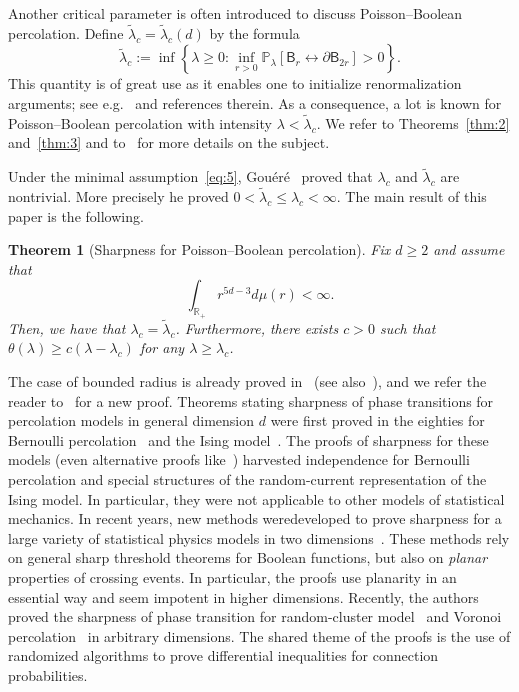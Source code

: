 \documentclass[10pt]{amsart}
\newtheorem{theo}{Theorem}[section]
\theoremstyle{definition}\newtheorem{defi}[theo]{Definition}\newtheorem{rema}[theo]{Remark}\newtheorem{exam}[theo]{Example}\newtheorem{exem}[theo]{Example}\newtheorem{nota}[theo]{Notation}
\begin{document}
Another critical parameter is often introduced to discuss Poisson--Boolean percolation. Define $\widetilde\lambda_c=\widetilde\lambda_c(d)$ by the formula
\[
\widetilde\lambda_c:=\inf\left\{\lambda\ge0:\inf_{r>0}{\mathbb P}_\lambda[\mathsf B_r\stackrel{}{\longleftrightarrow}\partial\mathsf B_{2r}]>0\right\}.
\]
This quantity is of great use as it enables one to initialize renormalization arguments; see e.g.~\cite{Gou1,Gou2} and references therein. As a consequence, a lot is known for Poisson--Boolean percolation with intensity $\lambda<\widetilde\lambda_c$. We refer to Theorems~\ref{thm:2} and~\ref{thm:3} and to~\cite{MeeRoy08} for more details on the subject.

Under the minimal assumption~\eqref{eq:5}, Gouéré~\cite{Gou1} proved that $\lambda_c$ and $\widetilde{\lambda}_c$ are nontrivial. More precisely he proved $0<\widetilde\lambda_c\le\lambda_c <\infty$. The main result of this paper is the following.

\begin{theo}[Sharpness for Poisson--Boolean percolation]\label{thm:main}
Fix $d\ge2$ and assume that
\begin{equation}
\int_{{\mathbb R}_+} r^{5d-3}d\mu(r)<\infty.\label{eq:7}
\end{equation}
Then, we have that $\lambda_c=\widetilde\lambda_c$. Furthermore, there exists $c>0$ such that $\theta(\lambda)\ge c(\lambda-\lambda_c)$ for any $\lambda\ge \lambda_c$.
\end{theo}




The case of bounded radius is already proved in~\cite{meester1994nonuniversality,zuev1985continuous} (see also~\cite{MeeRoy08}), and we refer the reader to~\cite{Zie16} for a new proof. Theorems stating sharpness of phase transitions for percolation models in general dimension $d$ were first proved in the eighties for Bernoulli percolation~\cite{AizBar87,Men86} and the Ising model~\cite{AizBarFer87}. The proofs of sharpness for these models (even alternative proofs like~\cite{DumTas15}) harvested independence for Bernoulli percolation and special structures of the random-current representation of the Ising model. In particular, they were not applicable to other models of statistical mechanics. In recent years, new methods were\linebreak developed to prove sharpness for a large variety of statistical physics models in two dimensions~\cite{ahlberg2016sharpness,BefDum12,BolRio06}. These methods rely on general sharp threshold theorems for Boolean functions, but also on \emph{planar} properties of crossing events. In particular, the proofs use planarity in an essential way and seem impotent in higher dimensions. Recently, the authors proved the sharpness of phase transition for random-cluster model~\cite{DumRaoTas16a} and Voronoi percolation~\cite{DumRaoTas16b} in arbitrary dimensions. The shared theme of the proofs is the use of randomized algorithms to prove differential inequalities for connection probabilities.
\end{document}
